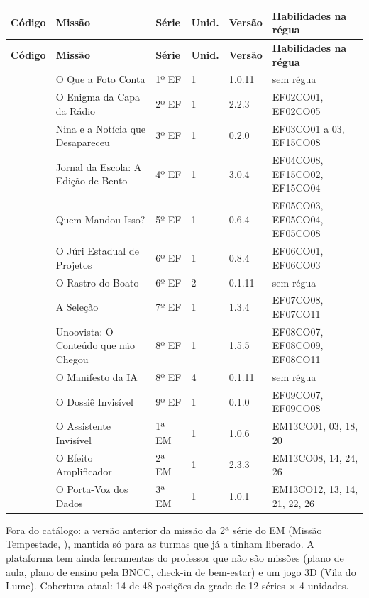 \begin{center}
\footnotesize\renewcommand{\arraystretch}{1.3}
\begin{tabularx}{\linewidth}{@{}L{20mm}L{52mm}C{10mm}C{9mm}L{13mm}X@{}}
\caption{Missões publicadas}\label{tab:catalogo}\\
\toprule
\textbf{Código} & \textbf{Missão} & \textbf{Série} & \textbf{Unid.} &
  \textbf{Versão} & \textbf{Habilidades na régua}\\
\midrule
\endfirsthead
\toprule
\textbf{Código} & \textbf{Missão} & \textbf{Série} & \textbf{Unid.} &
  \textbf{Versão} & \textbf{Habilidades na régua}\\
\midrule
\endhead
{} & O Que a Foto Conta & 1º EF & 1 & 1.0.11 & sem régua\\
 & O Enigma da Capa da Rádio & 2º EF & 1 & 2.2.3 & EF02CO01, EF02CO05\\
 & Nina e a Notícia que Desapareceu & 3º EF & 1 & 0.2.0 & EF03CO01 a 03, EF15CO08\\
 & Jornal da Escola: A Edição de Bento & 4º EF & 1 & 3.0.4 & EF04CO08, EF15CO02, EF15CO04\\
 & Quem Mandou Isso? & 5º EF & 1 & 0.6.4 & EF05CO03, EF05CO04, EF05CO08\\
 & O Júri Estadual de Projetos & 6º EF & 1 & 0.8.4 & EF06CO01, EF06CO03\\
 & O Rastro do Boato & 6º EF & 2 & 0.1.11 & sem régua\\
 & A Seleção & 7º EF & 1 & 1.3.4 & EF07CO08, EF07CO11\\
 & Unoovista: O Conteúdo que não Chegou & 8º EF & 1 & 1.5.5 & EF08CO07, EF08CO09, EF08CO11\\
 & O Manifesto da IA & 8º EF & 4 & 0.1.11 & sem régua\\
 & O Dossiê Invisível & 9º EF & 1 & 0.1.0 & EF09CO07, EF09CO08\\
 & O Assistente Invisível & 1ª EM & 1 & 1.0.6 & EM13CO01, 03, 18, 20\\
 & O Efeito Amplificador & 2ª EM & 1 & 2.3.3 & EM13CO08, 14, 24, 26\\
 & O Porta-Voz dos Dados & 3ª EM & 1 & 1.0.1 & EM13CO12, 13, 14, 21, 22, 26\\
\bottomrule
\end{tabularx}
\end{center}

\begin{nota}
Fora do catálogo: a versão anterior da missão da 2ª série do EM (Missão
Tempestade, ), mantida só para as turmas que já a tinham
liberado. A plataforma tem ainda ferramentas do professor que não são missões
(plano de aula, plano de ensino pela BNCC, check-in de bem-estar) e um jogo 3D
(Vila do Lume). Cobertura atual: 14 de 48 posições da grade de 12 séries
$\times$ 4 unidades.
\end{nota}
